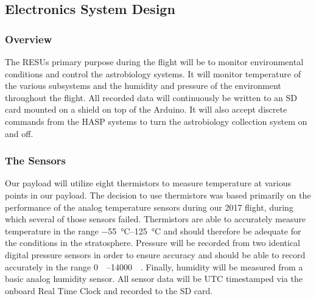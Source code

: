 \subsection{Electronics System Design}
\label{sec:RESU}

\subsubsection{Overview}

The RESUs primary purpose during the flight will be to monitor environmental conditions and control the astrobiology systems. It will monitor temperature of the various subsystems and the humidity and pressure of the environment throughout the flight. All recorded data will continuously be written to an SD card mounted on a shield on top of the Arduino. It will also accept discrete commands from the HASP systems to turn the astrobiology collection system on and off.

\subsubsection{The Sensors}

Our payload will utilize eight thermistors to measure temperature at various points in our payload. The decision to use thermistors was based primarily on the performance of the analog temperature sensors during our 2017 flight, during which several of those sensors failed. Thermistors are able to accurately measure temperature in the range \SIrange{-55}{125}{\celsius} and should therefore be adequate for the conditions in the stratosphere. Pressure will be recorded from two identical digital pressure sensors in order to ensure accuracy and should be able to record accurately in the range \SIrange{0}{14000}{\milli\bara}. Finally, humidity will be measured from a basic analog humidity sensor. All sensor data will be UTC timestamped via the onboard Real Time Clock and recorded to the SD card.



